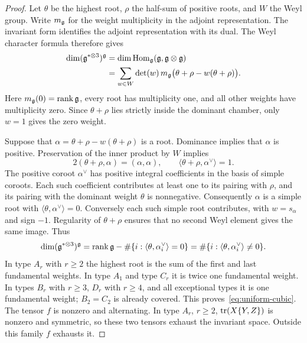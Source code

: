 \begin{proof}
Let $\theta$ be the highest root, $\rho$ the half-sum of positive roots,
and $W$ the Weyl group.  Write $m_{\mathfrak g}$ for the weight multiplicity in
the adjoint representation.  The invariant form identifies the adjoint
representation with its dual.  The Weyl character formula therefore gives
\begin{align}
\dim(\mathfrak g^{*\otimes3})^{\mathfrak g}
&=\dim\operatorname{Hom}_{\mathfrak g}(\mathfrak g,\mathfrak g\otimes\mathfrak g)\notag\\
&=\sum_{w\in W}\det(w)\,
m_{\mathfrak g}\bigl(\theta+\rho-w(\theta+\rho)\bigr).
\label{eq:adjoint-weyl-sum}
\end{align}
Here $m_{\mathfrak g}(0)=\operatorname{rank}\mathfrak g$, every root has multiplicity one,
and all other weights have multiplicity zero.  Since $\theta+\rho$ lies
strictly inside the dominant chamber, only $w=1$ gives the zero weight.

Suppose that $\alpha=\theta+\rho-w(\theta+\rho)$ is a root.
Dominance implies that $\alpha$ is positive.  Preservation of the inner
product by $W$ implies
\begin{equation}
2(\theta+\rho,\alpha)=(\alpha,\alpha),\qquad
\langle\theta+\rho,\alpha^\vee\rangle=1.
\end{equation}
The positive coroot $\alpha^\vee$ has positive integral coefficients in
the basis of simple coroots.  Each such coefficient contributes at least
one to its pairing with $\rho$, and its pairing with the dominant
weight $\theta$ is nonnegative.  Consequently $\alpha$ is a simple root
with $\langle\theta,\alpha^\vee\rangle=0$.  Conversely each such simple
root contributes, with $w=s_\alpha$ and sign $-1$.  Regularity of
$\theta+\rho$ ensures that no second Weyl element gives the same image.
Thus
\begin{equation}
\dim(\mathfrak g^{*\otimes3})^{\mathfrak g}
=\operatorname{rank}\mathfrak g-
\#\{i:\langle\theta,\alpha_i^\vee\rangle=0\}
=\#\{i:\langle\theta,\alpha_i^\vee\rangle\ne0\}.
\label{eq:highest-root-support}
\end{equation}
In type $A_r$ with $r\ge2$ the highest root is the sum of the first and
last fundamental weights.  In type $A_1$ and type $C_r$ it is twice one
fundamental weight.  In types $B_r$ with $r\ge3$, $D_r$ with $r\ge4$,
and all exceptional types it is one fundamental weight; $B_2=C_2$ is
already covered.  This proves~\eqref{eq:uniform-cubic}.
The tensor $f$ is nonzero and alternating.  In type $A_r$, $r\ge2$,
$\operatorname{tr}(X\{Y,Z\})$ is nonzero and symmetric, so these two tensors exhaust
the invariant space.  Outside this family $f$ exhausts it.
\end{proof}

